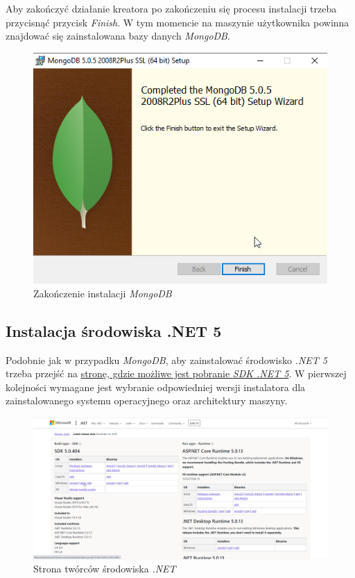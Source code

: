 \documentclass[a4paper,twoside,12pt]{book}
\begin{document}
Aby zakończyć działanie kreatora po zakończeniu się procesu instalacji trzeba przycisnąć przycisk \textit{Finish}. W tym momencie na maszynie użytkownika powinna znajdować się zainstalowana bazy danych \textit{MongoDB}.
\begin{figure}[h!]
	\centering
	\includegraphics[width=0.65\linewidth]{../zrzuty_ekranu/instalcja_mongodb/mongodb_finish}
	\caption{Zakończenie instalacji \textit{MongoDB}}
	\label{fig:mongodbfinish}
\end{figure}
\FloatBarrier

\subsection{Instalacja środowiska .NET 5}
Podobnie jak w przypadku \textit{MongoDB}, aby zainstalować środowisko \textit{.NET 5} trzeba przejść na \href{https://dotnet.microsoft.com/en-us/download/dotnet/5.0}{stronę, gdzie możliwe jest pobranie \textit{SDK .NET 5}}. W pierwszej kolejności wymagane jest wybranie odpowiedniej wersji instalatora dla zainstalowanego systemu operacyjnego oraz architektury maszyny.
\begin{figure}[h!]
	\centering
	\includegraphics[width=1\linewidth]{../zrzuty_ekranu/instalacja_dotnet5/dotnet_sdk}
	\caption{Strona twórców środowiska \textit{.NET}}
	\label{fig:dotnetsdk}
\end{figure}
\FloatBarrier
\end{document}
